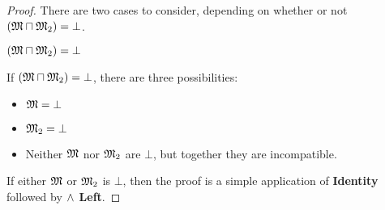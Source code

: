 \begin{proof}

There are two cases to consider, depending on whether or not $(\frak{M} \sqcap \frak{M}_2) = \bot$.

\setcounter{mycase}{0}

\begin{mycase}
$(\frak{M} \sqcap \frak{M}_2) = \bot$
\end{mycase}
If $(\frak{M} \sqcap \frak{M}_2) = \bot$, there are three possibilities:
\begin{itemize}
\item
$\frak{M} = \bot$
\item
$\frak{M}_2 = \bot$
\item
Neither $\frak{M}$ nor $\frak{M}_2$ are $\bot$, but together they are incompatible. 
\end{itemize}
If either $\frak{M}$ or $\frak{M}_2$ is $\bot$, then the proof is a simple application of {\bf Identity} followed by {\bf $\land$ Left}.


\end{proof}
